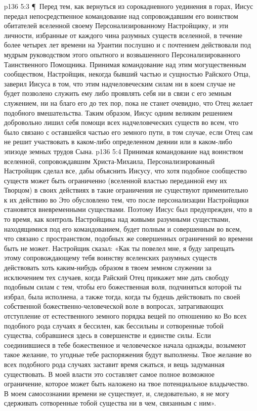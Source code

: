 \vs p136 5:3 \P\ Перед тем, как вернуться из сорокадневного уединения в горах, Иисус передал непосредственное командование над сопровождавшим его воинством обитателей вселенной своему Персонализированному Настройщику, и эти личности, избранные от каждого чина разумных существ вселенной, в течение более четырех лет времени на Урантии послушно и с почтением действовали под мудрым руководством этого опытного и возвышенного Персонализированного Таинственного Помощника. Принимая командование над этим могущественным сообществом, Настройщик, некогда бывший частью и сущностью Райского Отца, заверил Иисуса в том, что этим надчеловеческим силам ни в коем случае не будет позволено служить ему либо проявлять себя ни в связи с его земным служением, ни на благо его до тех пор, пока не станет очевидно, что Отец желает подобного вмешательства. Таким образом, Иисус одним великим решением добровольно лишил себя помощи всех надчеловеческих существ во всем, что было связано с оставшейся частью его земного пути, в том случае, если Отец сам не решит участвовать в каком\hyp{}либо определенном деянии или в каком\hyp{}либо эпизоде земных трудов Сына.
\vs p136 5:4 Принимая командование над воинством вселенной, сопровождавшим Христа\hyp{}Михаила, Персонализированный Настройщик сделал все, дабы объяснить Иисусу, что хотя подобное сообщество существ может быть ограниченно (вселенной властью переданной ему их Творцом) в своих действиях в  такие ограничения не существуют применительно к их действию во  Это обусловлено тем, что после персонализации Настройщики становятся вневременными существами. Поэтому Иисус был предупрежден, что в то время, как контроль Настройщика над живыми разумными существами, находящимися под его командованием, будет полным и совершенным во всем, что связано с пространством, подобных же совершенных ограничений во времени быть не может. Настройщик сказал: «Как ты повелел мне, я буду запрещать этому сопровождающему тебя воинству вселенских разумных существ действовать хоть каким\hyp{}нибудь образом в твоем земном служении за исключением тех случаев, когда Райский Отец прикажет мне дать свободу подобным силам с тем, чтобы его божественная воля, подчиняться которой ты избрал, была исполнена, а также тогда, когда ты будешь действовать по своей собственной божественно\hyp{}человеческой воле в вопросах, затрагивающих отступление от естественного земного порядка вещей по отношению ко  Во всех подобного рода случаях я бессилен, как бессильны и сотворенные тобой существа, собравшиеся здесь в совершенстве и единстве силы. Если соединившиеся в тебе божественное и человеческое начала однажды, возымеют такое желание, то угодные тебе распоряжения будут выполнены. Твое желание во всех подобного рода случаях заставит время сжаться, и вещь задуманная  существовать. В моей власти это составляет самое полное возможное ограничение, которое может быть наложено на твое потенциальное владычество. В моем самосознании времени не существует, и, следовательно, я не могу сдерживать сотворенные тобой существа ни в чем, связанным с ним».
